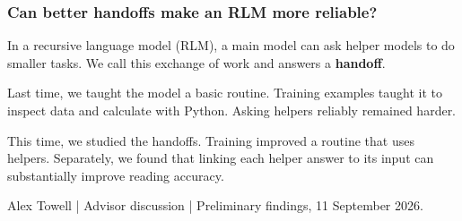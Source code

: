 \documentclass[aspectratio=169,11pt]{beamer}
\newcommand{\smallnote}[1]{\vfill{\scriptsize\color{Muted}#1\par}}
\begin{document}
\begin{frame}[t]
\frametitle{Can better handoffs make an RLM more reliable?}
In a recursive language model (RLM), a main model can ask helper models to do smaller tasks. We call this exchange of work and answers a \textbf{handoff}.\par
\vspace{3mm}
\begin{block}{Last time, we taught the model a basic routine.}
Training examples taught it to inspect data and calculate with Python. Asking helpers reliably remained harder.
\end{block}
\vspace{2mm}
\begin{block}{This time, we studied the handoffs.}
Training improved a routine that uses helpers. Separately, we found that linking each helper answer to its input can substantially improve reading accuracy.
\end{block}
\smallnote{Alex Towell \quad | \quad Advisor discussion \quad | \quad Preliminary findings, 11 September 2026.}
\end{frame}
\end{document}
